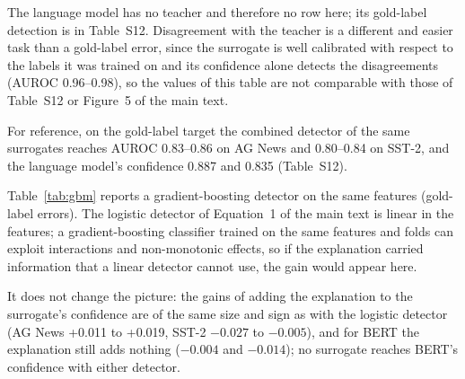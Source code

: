 \documentclass[review,12pt]{elsarticle}
\begin{document}
The language model has no teacher and therefore no row here; its gold-label detection is in Table~S12. Disagreement with the teacher is a different and easier task than a gold-label error, since the surrogate is well calibrated with respect to the labels it was trained on and its confidence alone detects the disagreements (AUROC 0.96--0.98), so the values of this table are not comparable with those of Table~S12 or Figure~5 of the main text.

For reference, on the gold-label target the combined detector of the same surrogates reaches AUROC 0.83--0.86 on AG News and 0.80--0.84 on SST-2, and the language model's confidence 0.887 and 0.835 (Table~S12).

Table~\ref{tab:gbm} reports a gradient-boosting detector on the same features (gold-label errors). The logistic detector of Equation~1 of the main text is linear in the features; a gradient-boosting classifier trained on the same features and folds can exploit interactions and non-monotonic effects, so if the explanation carried information that a linear detector cannot use, the gain would appear here.

It does not change the picture: the gains of adding the explanation to the surrogate's confidence are of the same size and sign as with the logistic detector (AG News +0.011 to +0.019, SST-2 \(-0.027\) to \(-0.005\)), and for BERT the explanation still adds nothing (\(-0.004\) and \(-0.014\)); no surrogate reaches BERT's confidence with either detector.
\end{document}
